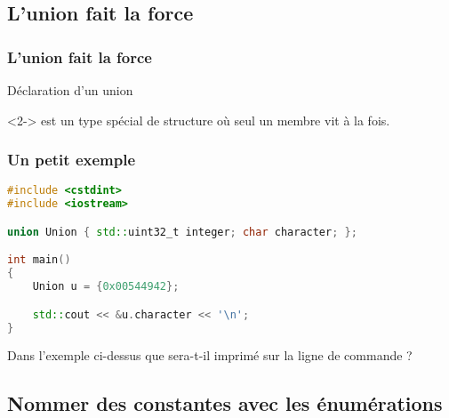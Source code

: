 \documentclass{cppcourses}
\begin{document}
\subsection{L'union fait la force}

\begin{frame}

\frametitle{L'union fait la force}

\begin{myfigure}
\caption{Déclaration d'un union}
\end{myfigure}

\begin{definition}<2->
 est un type spécial de structure où seul un membre vit à la fois.
\end{definition}

\end{frame}

\begin{frame}[fragile]

\frametitle{Un petit exemple}

\begin{example}

\begin{lstlisting}[language = c++]
#include <cstdint>
#include <iostream>

union Union { std::uint32_t integer; char character; };

int main()
{
    Union u = {0x00544942};

    std::cout << &u.character << '\n';
}
\end{lstlisting}

Dans l'exemple ci-dessus que sera-t-il imprimé sur la ligne de commande ?


\end{example}

\end{frame}

\subsection{Nommer des constantes avec les énumérations}
\end{document}
